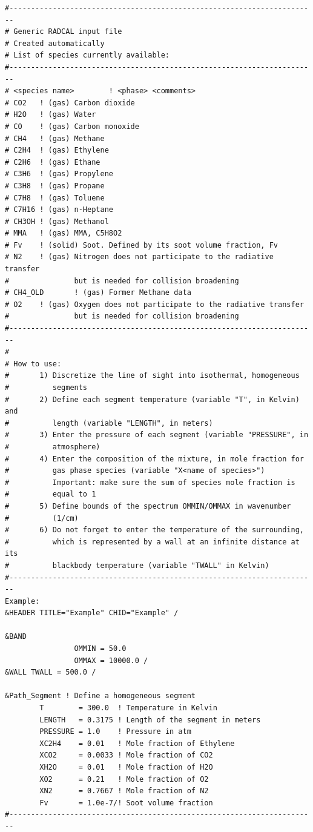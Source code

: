 \begin{lstlisting}
#-----------------------------------------------------------------------
# Generic RADCAL input file
# Created automatically
# List of species currently available:
#-----------------------------------------------------------------------
# <species name>        ! <phase> <comments>
# CO2   ! (gas) Carbon dioxide
# H2O   ! (gas) Water
# CO    ! (gas) Carbon monoxide
# CH4   ! (gas) Methane
# C2H4  ! (gas) Ethylene
# C2H6  ! (gas) Ethane
# C3H6  ! (gas) Propylene
# C3H8  ! (gas) Propane
# C7H8  ! (gas) Toluene
# C7H16 ! (gas) n-Heptane
# CH3OH ! (gas) Methanol
# MMA   ! (gas) MMA, C5H8O2
# Fv    ! (solid) Soot. Defined by its soot volume fraction, Fv
# N2    ! (gas) Nitrogen does not participate to the radiative transfer
#               but is needed for collision broadening
# CH4_OLD       ! (gas) Former Methane data
# O2    ! (gas) Oxygen does not participate to the radiative transfer
#               but is needed for collision broadening
#-----------------------------------------------------------------------
#
# How to use:
#       1) Discretize the line of sight into isothermal, homogeneous
#          segments
#       2) Define each segment temperature (variable "T", in Kelvin) and
#          length (variable "LENGTH", in meters)
#       3) Enter the pressure of each segment (variable "PRESSURE", in
#          atmosphere)
#       4) Enter the composition of the mixture, in mole fraction for
#          gas phase species (variable "X<name of species>")
#          Important: make sure the sum of species mole fraction is
#          equal to 1
#       5) Define bounds of the spectrum OMMIN/OMMAX in wavenumber
#          (1/cm)
#       6) Do not forget to enter the temperature of the surrounding,
#          which is represented by a wall at an infinite distance at its
#          blackbody temperature (variable "TWALL" in Kelvin)
#-----------------------------------------------------------------------
Example:
&HEADER TITLE="Example" CHID="Example" /

&BAND
                OMMIN = 50.0
                OMMAX = 10000.0 /
&WALL TWALL = 500.0 /

&Path_Segment ! Define a homogeneous segment
        T        = 300.0  ! Temperature in Kelvin
        LENGTH   = 0.3175 ! Length of the segment in meters
        PRESSURE = 1.0    ! Pressure in atm
        XC2H4    = 0.01   ! Mole fraction of Ethylene
        XCO2     = 0.0033 ! Mole fraction of CO2
        XH2O     = 0.01   ! Mole fraction of H2O
        XO2      = 0.21   ! Mole fraction of O2
        XN2      = 0.7667 ! Mole fraction of N2
        Fv       = 1.0e-7/! Soot volume fraction
#-----------------------------------------------------------------------
\end{lstlisting}


